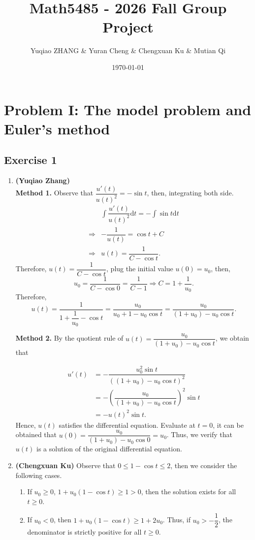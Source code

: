 \documentclass[11pt]{article}
\title{Math5485 - 2026 Fall Group Project}
\author{Yuqiao ZHANG \& Yuran Cheng \& Chengxuan Ku \& Mutian Qi}
\date{\today}
\begin{document}
\maketitle

\section{Problem I: The model problem and Euler’s method}

\subsection{Exercise 1}

\begin{enumerate}
    \item \textbf{(Yuqiao Zhang)} \\ 
    \textbf{Method 1.} Observe that $\dfrac{u'(t)}{u(t)^2} = -\sin t$, then, integrating both side. 
    $$\begin{aligned}
        & \int \dfrac{u'(t)}{u(t)^2} \mathrm{d}t  = - \int \sin t \mathrm{d}t \\ 
        \Longrightarrow &-\dfrac{1}{u(t)} = \cos t + C\\ 
        \Longrightarrow & u(t) = \dfrac{1}{C - \cos t}. 
    \end{aligned}$$
    Therefore, $u(t) = \dfrac{1}{C-\cos t}$, plug the initial value $u(0) = u_0$, then, $$u_0 = \dfrac{1}{C- \cos 0} = \dfrac{1}{C-1} \Longrightarrow C = 1 + \dfrac{1}{u_0}. $$
    Therefore, $$u(t) = \dfrac{1}{1+\dfrac{1}{u_0} - \cos t} = \dfrac{u_0}{u_0 + 1 - u_0 \cos t} = \dfrac{u_0}{(1+u_0) - u_0 \cos t}. $$

    \textbf{Method 2.}  By the quotient rule of $u(t)=\dfrac{u_0}{(1+u_0)-u_0\cos t}$, we obtain that

    $$\begin{aligned}
        u'(t)
        &= -\dfrac{u_0^2\sin t}{\left((1+u_0)-u_0\cos t\right)^2}\\
        &= -\left(\dfrac{u_0}{(1+u_0)-u_0\cos t}\right)^2\sin t\\
        &= -u(t)^2\sin t.
    \end{aligned}$$
    Hence, $u(t)$ satisfies the differential equation. Evaluate at $t = 0$, it can be obtained that $u(0) = \dfrac{u_0}{(1+u_0) - u_0 \cos 0} = u_0$. Thus, we verify that $u(t)$ is a solution of the original differential equation. 

    \item \textbf{(Chengxuan Ku)}  Observe that $0\leq 1-\cos t\leq 2 $, then we consider the following cases. 
    \begin{enumerate}[label=\Roman*. ]
        \item If $u_0\geq 0$, $1+u_0(1-\cos t)\geq 1>0$, then the solution exists for all $t \geq 0$. 
        \item If $u_0 <0$, then $1+u_0(1-\cos t)\geq 1+2u_0$. Thus, if $u_0>-\dfrac12$, the denominator is strictly positive for all $t\geq 0$.
        

\end{enumerate}
\end{enumerate}
\end{document}
